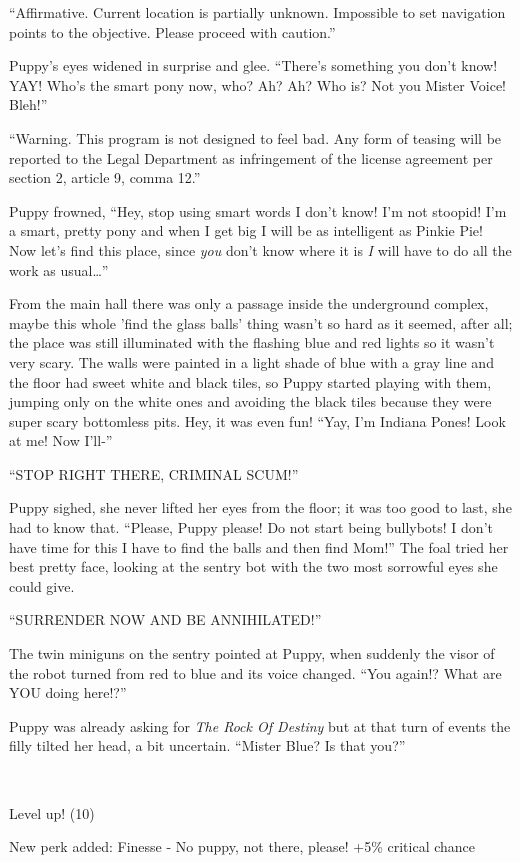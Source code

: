 ``{\mt Affirmative. Current location is partially unknown. Impossible to set navigation points to the objective. Please proceed with caution.}''

Puppy's eyes widened in surprise and glee. ``There's something you don't know! YAY! Who's the smart pony now, who? Ah? Ah? Who is? Not you Mister Voice! Bleh!''

``{\mt Warning. This program is not designed to feel bad. Any form of teasing will be reported to the Legal Department as infringement of the license agreement per section 2, article 9, comma 12.}''

Puppy frowned, ``Hey, stop using smart words I don't know! I'm not stoopid! I'm a smart, pretty pony and when I get big I will be as intelligent as Pinkie Pie! Now let's find this place, since \emph{you} don't know where it is \emph{I} will have to do all the work as usual\dots''

From the main hall there was only a passage inside the underground complex, maybe this whole 'find the glass balls' thing wasn't so hard as it seemed, after all; the place was still illuminated with the flashing blue and red lights so it wasn't very scary. The walls were painted in a light shade of blue with a gray line and the floor had sweet white and black tiles, so Puppy started playing with them, jumping only on the white ones and avoiding the black tiles because they were super scary bottomless pits. Hey, it was even fun! ``Yay, I'm Indiana Pones! Look at me! Now I'll-''

``STOP RIGHT THERE, CRIMINAL SCUM!''

Puppy sighed, she never lifted her eyes from the floor; it was too good to last, she had to know that. ``Please, Puppy please! Do not start being bullybots! I don't have time for this I have to find the balls and then find Mom!'' The foal tried her best pretty face, looking at the sentry bot with the two most sorrowful eyes she could give.

``SURRENDER NOW AND BE ANNIHILATED!''

The twin miniguns on the sentry pointed at Puppy, when suddenly the visor of the robot turned from red to blue and its voice changed. ``You again!? What are YOU doing here!?''

Puppy was already asking for \emph{The Rock Of Destiny} but at that turn of events the filly tilted her head, a bit uncertain. ``Mister Blue? Is that you?''

~\vfill

\begin{engnote}
    Level up! (10)
    
    New perk added: Finesse - No puppy, not there, please! +5\% critical chance
\end{engnote}




